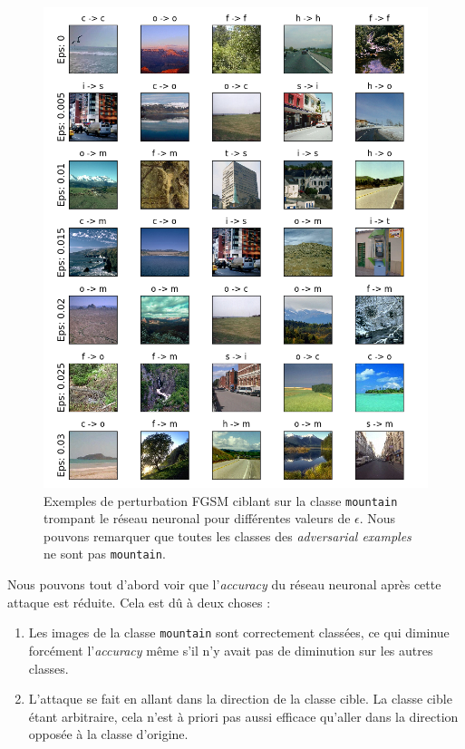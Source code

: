 \documentclass[10pt,twocolumn,letterpaper]{article}
\begin{document}
\begin{figure}[!hb]
\begin{center}
\includegraphics[width=0.85\linewidth]{ressources/fgsm_tget_img.png}
\end{center}
   \caption{Exemples de perturbation FGSM ciblant sur la classe \texttt{mountain} trompant le réseau neuronal pour différentes valeurs de $\epsilon$. Nous pouvons remarquer que toutes les classes des \textit{adversarial examples} ne sont pas \texttt{mountain}.}
\label{fig:fgsm_tget_img}
\end{figure}

Nous pouvons tout d'abord voir que l'\textit{accuracy} du réseau neuronal après cette attaque est réduite. Cela est dû à deux choses :

\begin{enumerate}
\item Les images de la classe \texttt{mountain} sont correctement classées, ce qui diminue forcément l'\textit{accuracy} même s'il n'y avait pas de diminution sur les autres classes.
\item L'attaque se fait en \og allant dans la direction \fg{} de la classe cible. La classe cible étant arbitraire, cela n'est à priori pas aussi efficace qu'aller \og dans la direction opposée \fg{}  à la classe d'origine.
\end{enumerate}
\end{document}
